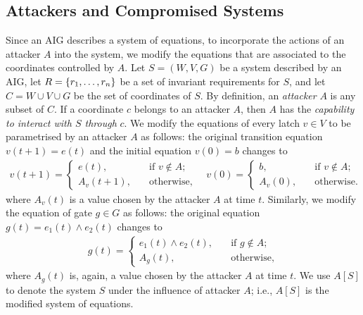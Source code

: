 \subsection{Attackers and Compromised Systems}
{\color{red}
Since an AIG describes a system of equations, to incorporate the actions of an attacker $A$ into the system, we modify the equations that are associated to the coordinates controlled by $A$. Let $S=(W,V,G)$ be a system described by an AIG, let $R=\left\{r_1, \ldots, r_n\right\}$ be a set of invariant requirements for $S$, and let $C=W\cup V\cup G$ be the set of coordinates of $S$. By definition, an \emph{attacker} $A$ is any subset of $C$. If a coordinate $c$ belongs to an attacker $A$, then $A$ has the \emph{capability to interact with $S$ through} $c$. We modify the equations of every latch $v\in V$ to be parametrised by an attacker $A$ as follows: the original transition equation $v(t+1)=e(t)$ and the initial equation $v(0)=b$ changes to
\begin{align}
\label{eq:badLatch}
v(t+1) = \begin{cases}
e(t), \quad &\text{if $v\not \in A$;}\\
A_v(t+1), \quad &\text{otherwise},
\end{cases}
\quad 
v(0)= \begin{cases}
b, \quad &\text{if $v \not \in A$;}\\
A_v(0), \quad &\text{otherwise.}
\end{cases}
\end{align}
where $A_v(t)$ is a value chosen by the attacker $A$ at time $t$. Similarly, we modify the equation of gate $g\in G$ as follows: the original equation $g(t)=e_1(t)\land e_2(t)$ changes to
\begin{align}
\label{eq:badGate}
g(t) = \begin{cases}
e_1(t)\land e_2(t), \quad &\text{if $g\not \in A$;}\\
A_g(t), \quad &\text{otherwise},
\end{cases}
\end{align}
where $A_g(t)$ is, again, a value chosen by the attacker $A$ at time $t$. We use $A[S]$ to denote the system $S$ under the influence of attacker $A$; i.e., $A[S]$ is the modified system of equations. 

}
